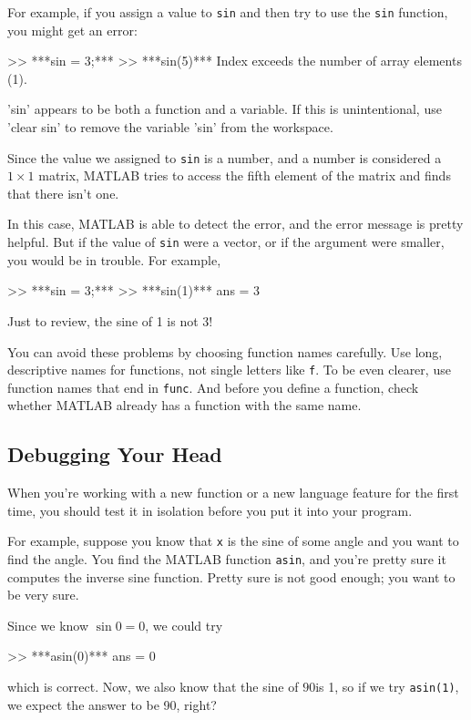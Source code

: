 For example, if you assign
a value to \lstinline{sin} and then try to use the \lstinline{sin} function, you
might get an error:

\begin{code}
>> ***sin = 3;***
>> ***sin(5)***
Index exceeds the number of array elements (1).

'sin' appears to be both a function and a variable.
If this is unintentional, use 'clear sin' to remove 
the variable 'sin' from the workspace.
\end{code}

Since the value we assigned to \lstinline{sin} is a number, and a number is considered a $1 \times 1$ matrix, MATLAB tries to access the fifth element of the matrix and finds that there isn't one.

In this case, MATLAB is able to detect the error, and the error message is pretty helpful.
But if the value of \lstinline{sin} were a vector, or if the argument were smaller, you would be in trouble.  For example,

\begin{code}
>> ***sin = 3;***
>> ***sin(1)***
ans = 3
\end{code}

Just to review, the sine of 1 is not 3!

You can avoid these problems by choosing function names carefully. Use long, descriptive names for functions, not single letters like \lstinline{f}. To be even clearer, use function names that end in \lstinline{func}. And before you define a function, check whether MATLAB already has a function with the same name.

\subsection{Debugging Your Head}

When you're working with a new function or a new language feature
for the first time, you should test it in isolation before you
put it into your program.


For example, suppose you know that \lstinline{x} is the sine of some
angle and you want to find the angle.  You find the MATLAB function
\lstinline{asin}, and you're pretty sure it computes the inverse sine
function.  Pretty sure is not good enough; you want to be very sure.

Since we know $\sin 0 = 0$, we could try

\begin{code}
>> ***asin(0)***
ans = 0
\end{code}
which is correct.  Now, we also know that the sine of $90$\textdegree is
1, so if we try \lstinline{asin(1)}, we expect the answer to be 90, right?

